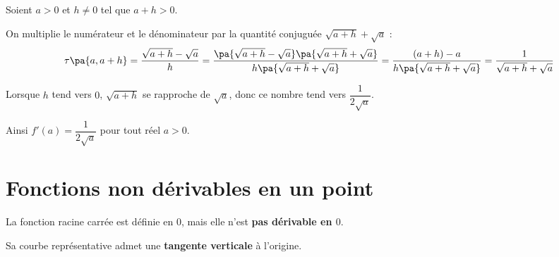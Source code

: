 \begin{demonstration}
	Soient $a > 0$ et $h \neq 0$ tel que $a + h > 0$.

	On multiplie le numérateur et le dénominateur par la quantité conjuguée $\sqrt{a + h} + \sqrt{a}$ :
	\[
		\tau\pa{a,a+h} = \dfrac{\sqrt{a + h} - \sqrt{a}}{h} = \dfrac{\pa{\sqrt{a + h} - \sqrt{a}}\pa{\sqrt{a + h} + \sqrt{a}}}{h\pa{\sqrt{a + h} + \sqrt{a}}} = \dfrac{(a + h) - a}{h\pa{\sqrt{a + h} + \sqrt{a}}} = \dfrac{1}{\sqrt{a + h} + \sqrt{a}}
	\]

	Lorsque $h$ tend vers $0$, $\sqrt{a + h}$ se rapproche de $\sqrt{a}$, donc ce nombre tend vers $\dfrac{1}{2\sqrt{a}}$.

	Ainsi $f'(a) = \dfrac{1}{2\sqrt{a}}$ pour tout réel $a > 0$.
\end{demonstration}

\section{Fonctions non dérivables en un point}

\begin{propriete}
	La fonction racine carrée est définie en $0$, mais elle n'est \textbf{pas dérivable en $0$}.

	Sa courbe représentative admet une \textbf{tangente verticale} à l'origine.
\end{propriete}


